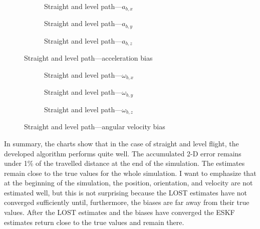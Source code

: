 \begin{figure}[H]
    \centering
    \begin{subfigure}{0.3\textwidth}
        
        \caption{Straight and level path---$a_{b,x}$}
    \end{subfigure}
    \hfill
    \begin{subfigure}{0.3\textwidth}
        
        \caption{Straight and level path---$a_{b,y}$}
    \end{subfigure}
    \hfill
    \begin{subfigure}{0.3\textwidth}
        
        \caption{Straight and level path---$a_{b,z}$}
    \end{subfigure}
    \caption{Straight and level path---acceleration bias}\label{fig:straight-level-abias}
\end{figure}

\begin{figure}[H]
    \centering
    \begin{subfigure}{0.3\textwidth}
        
        \caption{Straight and level path---$\omega_{b,x}$}
    \end{subfigure}
    \hfill
    \begin{subfigure}{0.3\textwidth}
        
        \caption{Straight and level path---$\omega_{b,y}$}
    \end{subfigure}
    \hfill
    \begin{subfigure}{0.3\textwidth}
        
        \caption{Straight and level path---$\omega_{b,z}$}
    \end{subfigure}
    \caption{Straight and level path---angular velocity bias}\label{fig:straight-level-wbias}
\end{figure}

In summary, the charts show that in the case of straight and level flight, the developed algorithm performs quite well. The accumulated 2-D error remains under 1\% of the travelled distance at the end of the simulation. The estimates remain close to the true values for the whole simulation. I want to emphasize that at the beginning of the simulation, the position, orientation, and velocity are not estimated well, but this is not surprising because the LOST estimates have not converged sufficiently until, furthermore, the biases are far away from their true values. After the LOST estimates and the biases have converged the ESKF estimates return close to the true values and remain there.

